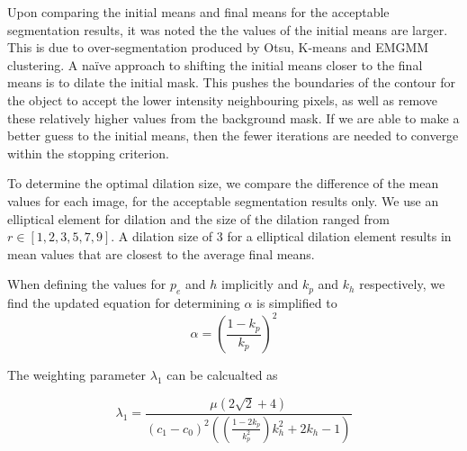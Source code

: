\documentclass[10pt, journal, letterpaper, onecolumn, draftcls]{IEEEtran}
\begin{document}
Upon comparing the initial means and final means for the acceptable segmentation results, it was noted the the values of the initial means are larger. This is due to over-segmentation produced by Otsu, K-means and EMGMM clustering. A na{\"i}ve approach to shifting the initial means closer to the final means is to dilate the initial mask. This pushes the boundaries of the contour for the object to accept the lower intensity neighbouring pixels, as well as remove these relatively higher values from the background mask. If we are able to make a better guess to the initial means, then the fewer iterations are needed to converge within the stopping criterion.

To determine the optimal dilation size, we compare the difference of the mean values for each image, for the acceptable segmentation results only. We use an elliptical element for dilation and the size of the dilation ranged from $r \in [1, 2, 3, 5 , 7, 9]$. A dilation size of 3 for a elliptical dilation element results in mean values that are closest to the average final means.

When defining the values for $p_e$ and $h$ implicitly and $k_p$ and $k_h$ respectively, we find the updated equation for determining $\alpha$ is simplified to
\begin{equation}
	\alpha = \left( \frac{1-k_p}{k_p} \right)^2
	\label{eq:alphafromkp}
\end{equation}



%

The weighting parameter $\lambda_1$ can be calcualted as

\begin{equation}
	\lambda_1 = \frac{\mu \left( 2\sqrt{2}+4\right)}{(c_1-c_0)^2\left( \left( \frac{1-2k_p}{k_p^2} \right)k_h^2 +2k_h -1 \right)}
	\label{eq:lambda1fromkpandkh}
\end{equation}
\end{document}
